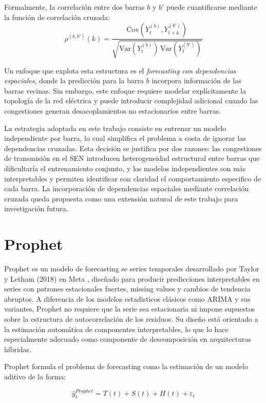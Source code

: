 Formalmente, la correlación entre dos barras $b$ y $b'$ puede cuantificarse mediante la función de correlación cruzada:
\begin{equation}
    \rho^{(b,b')}(k) = \frac{\text{Cov}(Y_t^{(b)}, Y_{t+k}^{(b')})}{\sqrt{\text{Var}(Y_t^{(b)})\,\text{Var}(Y_t^{(b')})}}
\end{equation}

Un enfoque que explota esta estructura es el \textit{forecasting con dependencias espaciales}, donde la predicción para la barra $b$ incorpora información de las barras vecinas. Sin embargo, este enfoque requiere modelar explícitamente la topología de la red eléctrica y puede introducir complejidad adicional cuando las congestiones generan desacoplamientos no estacionarios entre barras.

La estrategia adoptada en este trabajo consiste en entrenar un modelo independiente por barra, lo cual simplifica el problema a costa de ignorar las dependencias cruzadas. Esta decisión se justifica por dos razones: las congestiones de transmisión en el SEN introducen heterogeneidad estructural entre barras que dificultaría el entrenamiento conjunto, y los modelos independientes son más interpretables y permiten identificar con claridad el comportamiento especifico de cada barra. La incorporación de dependencias espaciales mediante correlación cruzada queda propuesta como una extensión natural de este trabajo para investigación futura.

\section{Prophet}

Prophet es un modelo de forecasting se series temporales desarrollado por Taylor y Letham (2018) en Meta \cite{Prophet}, diseñado para producir predicciones interpretables en series con patrones estacionales fuertes, missing values y cambios de tendencia abruptos. A diferencia de los modelos estadisticos clásicos como ARIMA y sus variantes, Prophet no requiere que la serie sea estacionaria ni impone supuestos sobre la estructura de autocorrelación de los residuos. Su diseño está orientado a la estimación automática de componentes interpretables, lo que lo hace especialmente adecuado como componente de descomposición en arquitecturas híbridas.

Prophet formula el problema de forecasting como la estimación de un modelo aditivo de la forma:

\begin{equation}
\hat{y}_t^{Prophet} = T(t) + S(t) + H(t) + \varepsilon_t
\end{equation}

